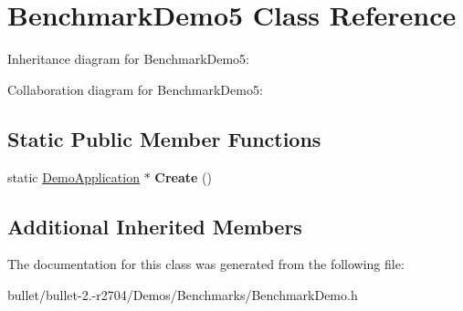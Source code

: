 \hypertarget{class_benchmark_demo5}{\section{Benchmark\+Demo5 Class Reference}
\label{class_benchmark_demo5}
}


Inheritance diagram for Benchmark\+Demo5\+:


Collaboration diagram for Benchmark\+Demo5\+:
\subsection*{Static Public Member Functions}
\begin{DoxyCompactItemize}
\item 
\hypertarget{class_benchmark_demo5_a694f66a1a789dcb85b1fa62812b4d7f1}{static \hyperlink{class_demo_application}{Demo\+Application} $\ast$ {\bfseries Create} ()}\label{class_benchmark_demo5_a694f66a1a789dcb85b1fa62812b4d7f1}

\end{DoxyCompactItemize}
\subsection*{Additional Inherited Members}


The documentation for this class was generated from the following file\+:\begin{DoxyCompactItemize}
\item 
bullet/bullet-\/2.-\/r2704/\+Demos/\+Benchmarks/Benchmark\+Demo.\+h\end{DoxyCompactItemize}
